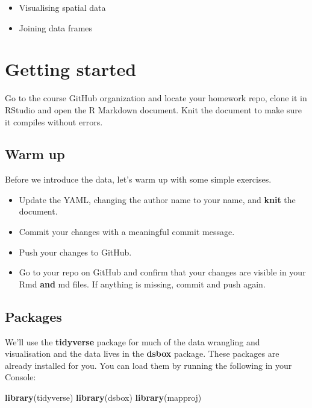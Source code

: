 \documentclass[
]{article}
\newenvironment{Shaded}{\begin{snugshade}}{\end{snugshade}}
\newcommand{\FunctionTok}[1]{\textcolor[rgb]{0.13,0.29,0.53}{\textbf{#1}}}
\newcommand{\NormalTok}[1]{#1}
\providecommand{\tightlist}{%
  \setlength{\itemsep}{0pt}\setlength{\parskip}{0pt}}
\begin{document}
\begin{itemize}
\tightlist
\item
  Visualising spatial data
\item
  Joining data frames
\end{itemize}

\section{Getting started}\label{getting-started}

Go to the course GitHub organization and locate your homework repo,
clone it in RStudio and open the R Markdown document. Knit the document
to make sure it compiles without errors.

\subsection{Warm up}\label{warm-up}

Before we introduce the data, let's warm up with some simple exercises.

\begin{itemize}
\tightlist
\item
  Update the YAML, changing the author name to your name, and
  \textbf{knit} the document.
\item
  Commit your changes with a meaningful commit message.
\item
  Push your changes to GitHub.
\item
  Go to your repo on GitHub and confirm that your changes are visible in
  your Rmd \textbf{and} md files. If anything is missing, commit and
  push again.
\end{itemize}

\subsection{Packages}\label{packages}

We'll use the \textbf{tidyverse} package for much of the data wrangling
and visualisation and the data lives in the \textbf{dsbox} package.
These packages are already installed for you. You can load them by
running the following in your Console:

\begin{Shaded}
\begin{Highlighting}[]
\FunctionTok{library}\NormalTok{(tidyverse) }
\FunctionTok{library}\NormalTok{(dsbox) }
\FunctionTok{library}\NormalTok{(mapproj) }
\end{Highlighting}
\end{Shaded}
\end{document}
